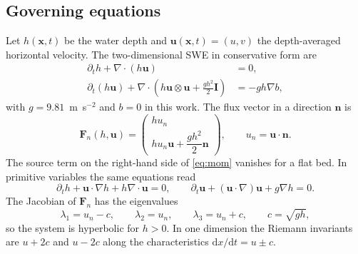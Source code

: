 ﻿\documentclass[11pt,a4paper]{article}
\newcommand{\bu}{\mathbf{u}}
\newcommand{\bn}{\mathbf{n}}
\newcommand{\bx}{\mathbf{x}}
\newcommand{\bF}{\mathbf{F}}
\newcommand{\bI}{\mathbf{I}}
\begin{document}
\subsection{Governing equations}
Let $h(\bx,t)$ be the water depth and $\bu(\bx,t)=(u,v)$ the depth-averaged
horizontal velocity.  The two-dimensional SWE in conservative form are
\begin{align}
  \partial_t h + \nabla\cdot(h\bu) &= 0, \label{eq:mass}\\
  \partial_t(h\bu) + \nabla\cdot\left(h\bu\otimes\bu
      + \frac{g h^2}{2}\bI\right) &= -g h\nabla b, \label{eq:mom}
\end{align}
with $g=9.81$~m~s$^{-2}$ and $b=0$ in this work.  The flux vector in a
direction $\bn$ is
\begin{equation}
  \bF_n(h,\bu) =
  \begin{pmatrix}
    h u_n\\[2pt]
    h u_n \bu + \dfrac{g h^2}{2}\bn
  \end{pmatrix},
  \qquad u_n=\bu\cdot\bn .
  \label{eq:flux}
\end{equation}
The source term on the right-hand side of \eqref{eq:mom} vanishes for a flat
bed.  In primitive variables the same equations read
\begin{equation}
  \partial_t h + \bu\cdot\nabla h + h\nabla\cdot\bu = 0,\qquad
  \partial_t\bu + (\bu\cdot\nabla)\bu + g\nabla h = 0 .
  \label{eq:primitive}
\end{equation}
The Jacobian of $\bF_n$ has the eigenvalues
\begin{equation}
  \lambda_1=u_n-c,\qquad \lambda_2=u_n,\qquad \lambda_3=u_n+c,
  \qquad c=\sqrt{g h},
  \label{eq:eigen}
\end{equation}
so the system is hyperbolic for $h>0$.  In one dimension the Riemann
invariants are $u+2c$ and $u-2c$ along the characteristics
$\mathrm{d}x/\mathrm{d}t=u\pm c$.
\end{document}

